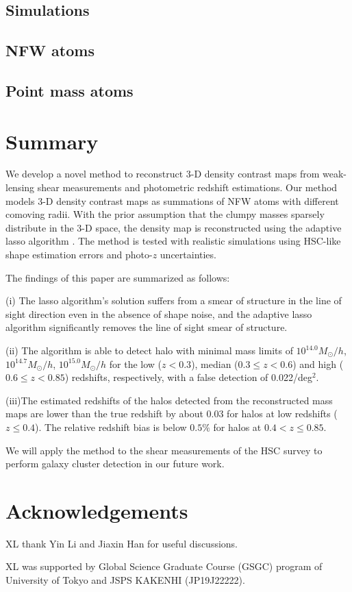 \documentclass[twocolumn]{aastex62}
\begin{document}
\subsection{Simulations}
\label{subsec_Sims}


\subsection{NFW atoms}
\label{subsec_test-nfw}


\subsection{Point mass atoms}
\label{subsec_test-pm}




\section{Summary}
\label{sec_Sum}

We develop a novel method to reconstruct $3$-D density contrast maps from
weak-lensing shear measurements and photometric redshift estimations.  Our
method models $3$-D density contrast maps as summations of NFW atoms with
different comoving radii.  With the prior assumption that the clumpy masses
sparsely distribute in the $3$-D space, the density map is reconstructed
using the adaptive lasso algorithm \citep{AdaLASSO-Zou2006}. The method is
tested with realistic simulations using HSC-like shape estimation errors and
photo-$z$ uncertainties.

The findings of this paper are summarized as follows:

(i) The lasso algorithm's solution suffers from a smear of structure in the
line of sight direction even in the absence of shape noise, and the adaptive
lasso algorithm significantly removes the line of sight smear of structure.

(ii) The algorithm is able to detect halo with minimal mass limits of
$10^{14.0} M_{\odot}/h$, $10^{14.7} M_{\odot}/h$, $10^{15.0} M_{\odot}/h$ for
the low ($z<0.3$), median ($0.3\leq z< 0.6$) and high ($0.6\leq z< 0.85$)
redshifts, respectively, with a false detection of 0.022/deg$^2$.

(iii)The estimated redshifts of the halos detected from the reconstructed mass
maps are lower than the true redshift by about $0.03$ for halos at low
redshifts ($z\leq 0.4$).  The relative redshift bias is below $0.5\%$ for halos
at $0.4<z\leq 0.85$.

We will apply the method to the shear measurements of the HSC survey
\citep{HSC1-catalog,FPFSHSC1-Li2020} to perform galaxy cluster detection in our
future work.

\section*{Acknowledgements}
XL thank Yin Li and Jiaxin Han for useful discussions.

XL was supported by Global Science Graduate Course (GSGC) program of
University of Tokyo and JSPS KAKENHI (JP19J22222).


\end{document}
